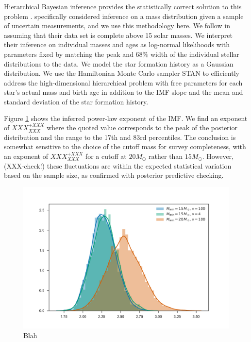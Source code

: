 \documentclass[apjl]{emulateapj}
\begin{document}
Hierarchical Bayesian inference provides the statistically correct solution to this problem \cite{Hogg:2010}.  \citet{Mandel:2010stat} specifically considered inference on a mass distribution given a sample of uncertain measurements, and we use this methodology here.  We follow \citet{Schneider:2018} in assuming that their data set is complete above 15 solar masses.  We interpret their inference on individual masses and ages as log-normal likelihoods with parameters fixed by matching the peak and 68\% width of the individual stellar distributions to the \citet{Schneider:2018} data.  We model the star formation history as a Gaussian distribution.  We use the Hamiltonian Monte Carlo sampler STAN \cite{STAN} to efficiently address the high-dimensional hierarchical problem with free parameters for each star's actual mass and birth age in addition to the IMF slope and the mean and standard deviation of the star formation history.  

Figure \ref{fig:IMF} shows the inferred power-law exponent of the IMF.  We find an exponent of $XXX^{+XXX}_{XXX}$ where the quoted value corresponds to the peak of the posterior distribution and the range to the 17th and 83rd percentiles.  The conclusion is somewhat sensitive to the choice of the cutoff mass for survey completeness, with an exponent of $XXX^{+XXX}_{XXX}$ for a cutoff at $20 M_\odot$ rather than $15 M_\odot$.  However, (XXX-check!) these fluctuations are within the expected statistical variation based on the sample size, as confirmed with posterior predictive checking.  

\begin{figure}
    		    		\includegraphics[trim={0cm 0cm 0cm 0cm},clip,scale=0.4]{alpha.pdf}
    		\caption{Blah}\label{fig:IMF}
\end{figure}
\end{document}

